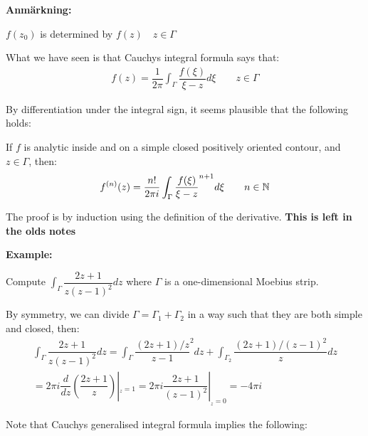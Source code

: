\par\bigskip
\noindent\textbf{Anmärkning:}\par
\noindent $f(z_0)$ is determined by $f(z)\quad z\in \Gamma$
\par\bigskip
\noindent What we have seen is that Cauchys integral formula says that:
\begin{equation*}
  \begin{gathered}
    f(z) = \dfrac{1}{2\pi}\int_{\Gamma}\dfrac{f(\xi)}{\xi-z}d\xi\qquad z\in\Gamma
  \end{gathered}
\end{equation*}
\par\bigskip
\noindent By differentiation under the integral sign, it seems plausible that the following holds:
\par\bigskip
\begin{theo}{}
  If $f$ is analytic inside and on a simple closed positively oriented contour, and $z\in \Gamma$, then:
  \begin{equation*}
    \begin{gathered}
      f^{(n)}(z) = \dfrac{n!}{2\pi i}\int_{\Gamma}\dfrac{f(\xi)}{\xi-z}^{n+1}d\xi\qquad n\in\mathbb{N}
    \end{gathered}
  \end{equation*}
\end{theo}
\par\bigskip
\noindent The proof is by induction using the definition of the derivative. \textbf{This is left in the olds notes}
\par\bigskip
\noindent\textbf{Example:}\par
\noindent Compute $\int_{\Gamma}\dfrac{2z+1}{z(z-1)^2}dz$ where $\Gamma$ is a one-dimensional Moebius strip.
\par\bigskip
\noindent By symmetry, we can divide $\Gamma = \Gamma_1+\Gamma_2$ in a way such that they are both simple and closed, then:
\begin{equation*}
  \begin{gathered}
    \int_{\Gamma}\dfrac{2z+1}{z(z-1)^2}dz = \int_{\Gamma}\dfrac{(2z+1)/z}{z-1}^2dz+\int_{\Gamma_2}\dfrac{(2z+1)/(z-1)^2}{z}dz\\
    = 2\pi i\dfrac{d}{dz}\left(\dfrac{2z+1}{z}\right)|_{_z = 1} = 2\pi i \dfrac{2z+1}{(z-1)^2}|_{_z = 0} = -4\pi i
  \end{gathered}
\end{equation*}
\par\bigskip
\noindent Note that Cauchys generalised integral formula implies the following:
